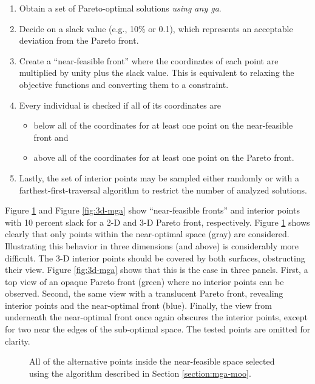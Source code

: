 \begin{enumerate}
    \item Obtain a set of Pareto-optimal solutions \textit{using any \ac{ga}}.
    \item Decide on a slack value (e.g., 10\% or 0.1), which represents an
    acceptable deviation from the Pareto front.
    \item Create a ``near-feasible front'' where the coordinates of each point
    are multiplied by unity plus the slack value. This is equivalent to relaxing
    the objective functions and converting them to a constraint. 
    \item Every individual is checked if all of its coordinates are
    \begin{itemize}
        \item below all of the coordinates for at least one point on the
        near-feasible front and
        \item above all of the coordinates for at least one point on the Pareto
        front.
    \end{itemize}  
    \item Lastly, the set of interior points may be sampled either randomly or
    with a farthest-first-traversal algorithm to restrict the number of analyzed
    solutions.
\end{enumerate}
\noindent
Figure \ref{fig:nd-mga} and Figure \ref{fig:3d-mga} show ``near-feasible
fronts'' and interior points with 10 percent slack for a 2-D and 3-D Pareto
front, respectively. Figure \ref{fig:nd-mga} shows clearly that only points
within the near-optimal space (gray) are considered. Illustrating this behavior
in three dimensions (and above) is considerably more difficult. The 3-D interior
points should be covered by both surfaces, obstructing their view. Figure
\ref{fig:3d-mga} shows that this is the case in three panels. First, a top view
of an opaque Pareto front (green) where no interior points can be observed.
Second, the same view with a translucent Pareto front, revealing interior points
and the near-optimal front (blue). Finally, the view from underneath the
near-optimal front once again obscures the interior points, except for two near
the edges of the sub-optimal space. The tested points are omitted for clarity.

\begin{figure}[h]
  \centering
  \resizebox{0.6\columnwidth}{!}{}
  \caption{All of the alternative points inside the near-feasible space selected
  using the algorithm described in Section \ref{section:mga-moo}.}
  \label{fig:nd-mga}
\end{figure}

